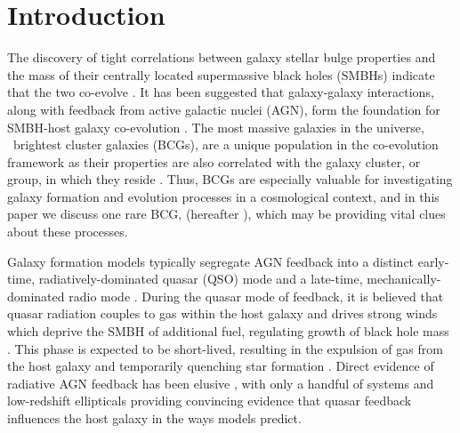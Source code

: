 \documentclass[referee,traditabstract]{aa}
\begin{document}

\keywords{\mykeywords}
\maketitle

\section{Introduction}
\label{sec:intro}

The discovery of tight correlations between galaxy stellar bulge
properties and the mass of their centrally located supermassive black
holes (SMBHs) indicate that the two co-evolve
\citep[\eg][]{1995ARA&A..33..581K, magorrian, 2000ApJ...539L...9F,
  2000ApJ...539L..13G, 2001ApJ...563L..11G}. It has been suggested
that galaxy-galaxy interactions, along with feedback from active
galactic nuclei (AGN), form the foundation for SMBH-host galaxy
co-evolution \citep[\eg][]{1995MNRAS.276..663B, 1998A&A...331L...1S,
  2000MNRAS.311..576K, 2001MNRAS.324..757G}. The most massive galaxies
in the universe, \eg\ brightest cluster galaxies (BCGs), are a unique
population in the co-evolution framework as their properties are also
correlated with the galaxy cluster, or group, in which they reside
\citep[\eg][]{1984ApJ...276...38J, 1998ApJ...502..141D}. Thus, BCGs
are especially valuable for investigating galaxy formation and
evolution processes in a cosmological context, and in this paper we
discuss one rare BCG, \object{\inine} (hereafter \irs), which may be
providing vital clues about these processes.

Galaxy formation models typically segregate AGN feedback into a
distinct early-time, radiatively-dominated quasar (QSO) mode
\citep[\eg][]{2005Natur.435..629S, 2006ApJS..163....1H} and a
late-time, mechanically-dominated radio mode \citep[\eg][]{croton06,
  bower06}. During the quasar mode of feedback, it is believed that
quasar radiation couples to gas within the host galaxy and drives
strong winds which deprive the SMBH of additional fuel, regulating
growth of black hole mass \citep[\eg][]{2005ApJ...630..705H,
  2005Natur.433..604D}. This phase is expected to be short-lived,
resulting in the expulsion of gas from the host galaxy and temporarily
quenching star formation \citep[\eg][]{2006ApJ...642L.107N,
  2008ApJ...686..219M}. Direct evidence of radiative AGN feedback has
been elusive \citep[see][for a review]{2005ARA&A..43..769V}, with only
a handful of systems \citep[\eg][]{2008A&A...492...81P,
  2010A&A...518L.155F} and low-redshift ellipticals
\citep{2009ApJ...690.1672S} providing convincing evidence that quasar
feedback influences the host galaxy in the ways models predict.
\end{document}
